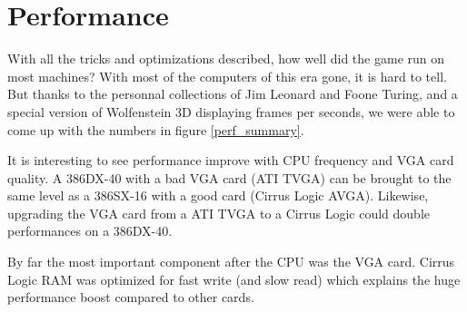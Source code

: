 \section{Performance}
With all the tricks and optimizations described, how well did the game run on most machines? With most of the computers of this era gone, it is hard to tell. But thanks to the personnal collections of Jim Leonard and Foone Turing, and a special version of Wolfenstein 3D displaying frames per seconds, we were able to come up with the numbers in figure \ref{perf_summary}.\\
\par
It is interesting to see performance improve with CPU frequency and VGA card quality. A 386DX-40 with a bad VGA card (ATI TVGA) can be brought to the same level as a 386SX-16 with a good card (Cirrus Logic AVGA). Likewise, upgrading the VGA card from a ATI TVGA to a Cirrus Logic could double performances on a  386DX-40.\\ 
\par
By far the most important component after the CPU was the VGA card. Cirrus Logic RAM was optimized for fast write (and slow read) which explains the huge performance boost compared to other cards.

